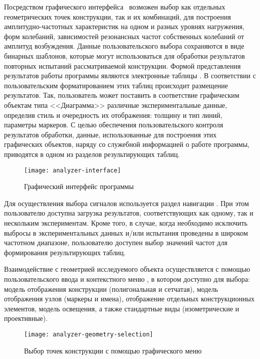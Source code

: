 Посредством графического интерфейса~ возможен выбор как отдельных геометрических точек конструкции, так и их комбинаций, для построения амплитудно-частотных характеристик на одном и разных уровнях нагружения, форм колебаний, зависимостей резонансных частот собственных колебаний от амплитуд возбуждения. Данные пользовательского выбора сохраняются в виде бинарных шаблонов, которые могут использоваться для обработки результатов повторных испытаний рассматриваемой конструкции. Формой представления результатов работы программы являются электронные таблицы . В соответствии с пользовательским форматированием этих таблиц происходит размещение результатов. Так, пользователь может поставить в соответствие графическим объектам типа <<Диаграмма>> различные экспериментальные данные, определив стиль и очередность их отображения: толщину и тип линий, параметры маркеров. С целью обеспечения пользовательского контроля результатов обработки, данные, использованные для построения этих графических объектов, наряду со служебной информацией о работе программы, приводятся в одном из разделов результирующих таблиц.

\begin{figure}[!htb]
	\centerfloat
	\texttt{[image: analyzer-interface]}
	\caption{Графический интерфейс программы} \label{fig:analyzer-interface}
\end{figure}

Для осуществления выбора сигналов используется раздел навигации  . При этом пользователю доступна загрузка результатов, соответствующих как одному, так и нескольким экспериментам. Кроме того, в случае, когда необходимо исключить выбросы в экспериментальных данных и/или испытания проведены в широком частотном диапазоне, пользователю доступен выбор значений частот для формирования результирующих таблиц.

Взаимодействие с геометрией исследуемого объекта осуществляется с помощью пользовательского ввода и контекстного меню , в котором доступно для выбора: модель отображения конструкции (полигональная и сетчатая), модель отображения узлов (маркеры и имена), отображение отдельных конструкционных элементов, модель освещения, а также стандартные виды (изометрические и проективные).

\begin{figure}[!htb]
	\centerfloat
	\texttt{[image: analyzer-geometry-selection]}
	\caption{Выбор точек конструкции с помощью графического меню} \label{fig:analyzer-geometry-selection}
\end{figure}

